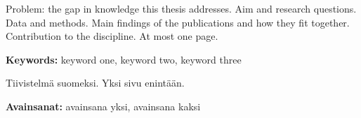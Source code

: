 
Problem: the gap in knowledge this thesis addresses. Aim and research
questions. Data and methods. Main findings of the publications and how they
fit together. Contribution to the discipline. At most one page.

\bigskip
\noindent\textbf{Keywords:} keyword one, keyword two, keyword three

\cleardoublepage
\begin{otherlanguage}{finnish}

Tiivistelmä suomeksi. Yksi sivu enintään.

\bigskip
\noindent\textbf{Avainsanat:} avainsana yksi, avainsana kaksi
\end{otherlanguage}
